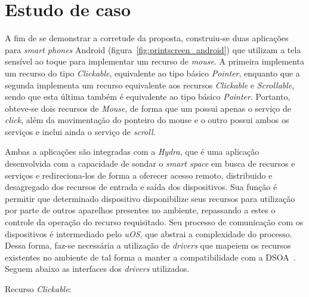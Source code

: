 \section{Estudo de caso}
\label{sec:estudoDeCaso}

A fim de se demonstrar a corretude da proposta, construiu-se duas aplicações para \emph{smart phones} Android (figura~\ref{fig:printscreen_android}) que utilizam a tela sensível ao toque para implementar um recurso de \emph{mouse}. A primeira implementa um recurso do tipo \emph{Clickable}, equivalente ao tipo básico \emph{Pointer}, enquanto que a segunda implementa um recurso equivalente aos recursos \emph{Clickable} e \emph{Scrollable}, sendo que esta última também é equivalente ao tipo básico \emph{Pointer}. Portanto, obteve-se dois recursos de \emph{Mouse}, de forma que um possui apenas o serviço de \emph{click}, além da movimentação do ponteiro do mouse e o outro possui ambos os serviços e inclui ainda o serviço de \emph{scroll}.

Ambas a aplicações são integradas com a \emph{Hydra}, que é uma aplicação desenvolvida com a capacidade de sondar o \emph{smart space} em busca de recursos e serviços e redireciona-los de forma a oferecer acesso remoto, distribuido e desagregado dos recursos de entrada e saída dos dispositivos. Sua função é permitir que determinado dispositivo disponibilize seus recursos para utilização por parte de outros aparelhos presentes no ambiente, repassando a estes o controle da operação do recurso requisitado. Seu processo de comunicação com os dispositivos é intermediado pelo \emph{uOS}, que abstrai a complexidade do processo. Dessa forma, faz-se necessária a utilização de \emph{drivers} que mapeiem os recursos existentes no ambiente de tal forma a manter a compatibilidade com a DSOA~\cite{lucas2011}. Seguem abaixo as interfaces dos \emph{drivers} utilizados.

Recurso \emph{Clickable}:

